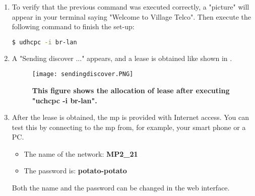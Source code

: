 \begin{enumerate}
\item To verify that the previous command was executed correctly, a "picture" will appear in your terminal saying "Welcome to Village Telco". Then execute the following command to finish the set-up:
\noindent
\begin{lstlisting}[language=bash]
 $ udhcpc -i br-lan
\end{lstlisting}
\item A "Sending discover ..." appears, and a lease is obtained like shown in . 
\begin{figure}[h!]
  \centering
      \texttt{[image: sendingdiscover.PNG]}
  \caption [The results from executing "uchcpc -i br-lan".]{\textbf{This figure shows the allocation of lease after executing "uchcpc -i br-lan".}}
  \label{fig:sendingdiscover}
\end{figure}
\item After the lease is obtained, the \gls{mp} is provided with Internet access. You can test this by connecting to the \gls{mp} from, for example, your smart phone or a PC. 
\begin{itemize}
\item The name of the network: \textbf{MP2_21}
\item The password is: \textbf{potato-potato}
\end{itemize}
Both the name and the password can be changed in the web interface. 
\end{enumerate}

